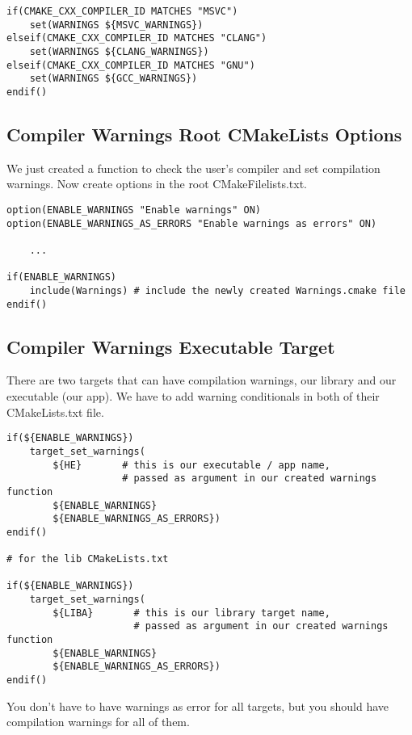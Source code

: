 \begin{verbatim}
if(CMAKE_CXX_COMPILER_ID MATCHES "MSVC")
    set(WARNINGS ${MSVC_WARNINGS})
elseif(CMAKE_CXX_COMPILER_ID MATCHES "CLANG")
    set(WARNINGS ${CLANG_WARNINGS})
elseif(CMAKE_CXX_COMPILER_ID MATCHES "GNU")
    set(WARNINGS ${GCC_WARNINGS})
endif()
\end{verbatim}


\subsection{Compiler Warnings Root CMakeLists Options}

We just created a function to check the user's compiler and set compilation warnings.
Now create options in the root CMakeFilelists.txt.

\begin{verbatim}
option(ENABLE_WARNINGS "Enable warnings" ON)
option(ENABLE_WARNINGS_AS_ERRORS "Enable warnings as errors" ON)

    ...

if(ENABLE_WARNINGS)
    include(Warnings) # include the newly created Warnings.cmake file
endif()
\end{verbatim}


\subsection{Compiler Warnings Executable Target}

There are two targets that can have compilation warnings, our library and our executable (our app). We have to 
add warning conditionals in both of their CMakeLists.txt file.

\begin{verbatim}
if(${ENABLE_WARNINGS})
    target_set_warnings(
        ${HE}       # this is our executable / app name,
                    # passed as argument in our created warnings function
        ${ENABLE_WARNINGS}
        ${ENABLE_WARNINGS_AS_ERRORS})
endif()

# for the lib CMakeLists.txt

if(${ENABLE_WARNINGS})
    target_set_warnings(
        ${LIBA}       # this is our library target name,
                      # passed as argument in our created warnings function
        ${ENABLE_WARNINGS}
        ${ENABLE_WARNINGS_AS_ERRORS})
endif()
\end{verbatim}

You don't have to have warnings as error for all targets, but you should have compilation warnings for all of them.


